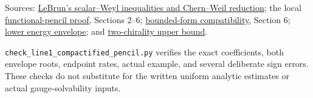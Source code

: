 \documentclass[
  11pt,
]{article}
\begin{document}
Sources: \href{https://arxiv.org/abs/math/0003068}{LeBrun's scalar--Weyl
inequalities and Chern--Weil reduction}; the local
\href{line1_functional_pencil.md}{functional-pencil proof}, Sections
2--6; \href{round21_analytic.md}{bounded-form compatibility}, Section 6;
\href{line1_energy_envelope_gap.md}{lower energy envelope}; and
\href{line1_two_chirality_topology.md}{two-chirality upper bound}.

\texttt{check\_line1\_compactified\_pencil.py} verifies the exact
coefficients, both envelope roots, endpoint rates, actual example, and
several deliberate sign errors. These checks do not substitute for the
written uniform analytic estimates or actual gauge-solvability inputs.
\end{document}
